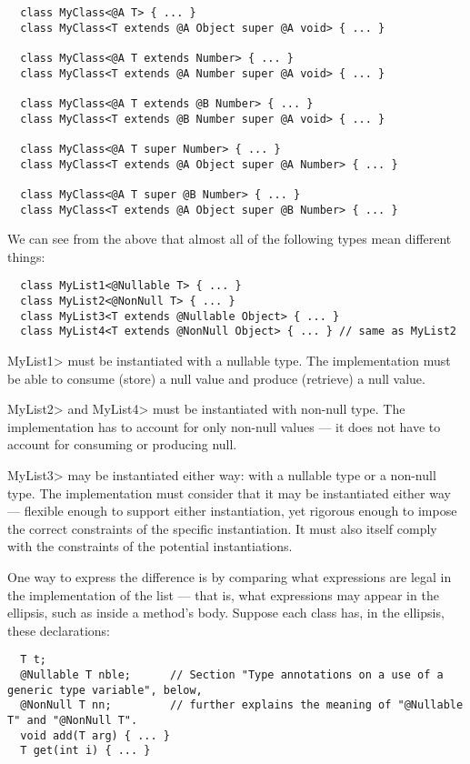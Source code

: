 \begin{Verbatim}
  class MyClass<@A T> { ... }
  class MyClass<T extends @A Object super @A void> { ... }

  class MyClass<@A T extends Number> { ... }
  class MyClass<T extends @A Number super @A void> { ... }

  class MyClass<@A T extends @B Number> { ... }
  class MyClass<T extends @B Number super @A void> { ... }

  class MyClass<@A T super Number> { ... }
  class MyClass<T extends @A Object super @A Number> { ... }

  class MyClass<@A T super @B Number> { ... }
  class MyClass<T extends @A Object super @B Number> { ... }
\end{Verbatim}

We can see from the above that almost all of the following types mean
different things:

\begin{Verbatim}
  class MyList1<@Nullable T> { ... }
  class MyList2<@NonNull T> { ... }
  class MyList3<T extends @Nullable Object> { ... }
  class MyList4<T extends @NonNull Object> { ... } // same as MyList2
\end{Verbatim}

\<MyList1> must be instantiated with a nullable type. 
The implementation must be able to consume (store) a null
value and produce (retrieve) a null value.

\<MyList2> and \<MyList4> must be instantiated with non-null type.
The implementation has to account for only non-null values --- it
does not have to account for consuming or producing null.

\<MyList3> may be instantiated either way:
with a nullable type or a non-null type.  The implementation must consider
that it may be instantiated either way --- flexible enough to support either
instantiation, yet rigorous enough to impose the correct constraints of the
specific instantiation.  It must also itself comply with the constraints of
the potential instantiations.

One way to express the difference is by comparing what expressions are
legal in the implementation of the list --- that is, what expressions may
appear in the ellipsis, such as inside a method's body.  Suppose each class
has, in the ellipsis, these declarations:

\begin{Verbatim}
  T t;
  @Nullable T nble;      // Section "Type annotations on a use of a generic type variable", below,
  @NonNull T nn;         // further explains the meaning of "@Nullable T" and "@NonNull T".
  void add(T arg) { ... }
  T get(int i) { ... }
\end{Verbatim}

